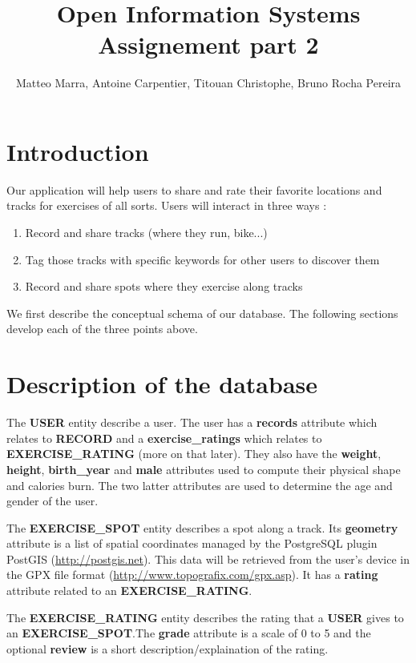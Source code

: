 \documentclass[a4paper]{article}
\title{Open Information Systems\\Assignement part 2 }
\author{Matteo Marra, Antoine Carpentier, Titouan Christophe, Bruno Rocha Pereira}
\begin{document}
\maketitle

\section{Introduction}

Our application will help users to share and rate their favorite locations and tracks for exercises of all sorts. Users will interact in three ways : 

\begin{enumerate}
    \item Record and share tracks (where they run, bike...)
    \item Tag those tracks with specific keywords for other users to discover them
    \item Record and share spots where they exercise along tracks
\end{enumerate}

We first describe the conceptual schema of our database. The following sections develop each of the three points above.

\section{Description of the database}

The \textbf{USER} entity describe a user. The user has a \textbf{records} attribute which relates to \textbf{RECORD} and a \textbf{exercise\_ratings} which relates to \textbf{EXERCISE\_RATING} (more on that later). They also have the \textbf{weight}, \textbf{height}, \textbf{birth\_year} and \textbf{male} attributes used to compute their physical shape and calories burn. The two latter attributes are used to determine the age and gender of the user.

The \textbf{EXERCISE\_SPOT} entity describes a spot along a track. Its \textbf{geometry} attribute is a list of spatial coordinates managed by the PostgreSQL plugin PostGIS (\url{http://postgis.net}). This data will be retrieved from the user's device in the GPX file format (\url{http://www.topografix.com/gpx.asp}). It has a \textbf{rating} attribute related to an \textbf{EXERCISE\_RATING}.

The \textbf{EXERCISE\_RATING} entity describes the rating that a \textbf{USER} gives to an \textbf{EXERCISE\_SPOT}.The \textbf{grade} attribute is a scale of 0 to 5 and the optional \textbf{review} is a short description/explaination of the rating.
\end{document}

